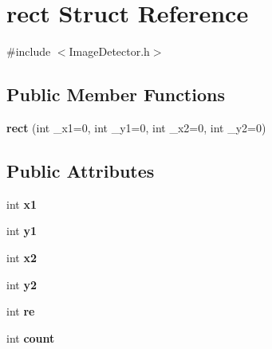 \hypertarget{structrect}{}\section{rect Struct Reference}
\label{structrect}


{\ttfamily \#include $<$Image\+Detector.\+h$>$}

\subsection*{Public Member Functions}
\begin{DoxyCompactItemize}
\item 
\hypertarget{structrect_ac4d3220b8b456e1ba3a17ce1c3c8dd9e}{}{\bfseries rect} (int \+\_\+x1=0, int \+\_\+y1=0, int \+\_\+x2=0, int \+\_\+y2=0)\label{structrect_ac4d3220b8b456e1ba3a17ce1c3c8dd9e}

\end{DoxyCompactItemize}
\subsection*{Public Attributes}
\begin{DoxyCompactItemize}
\item 
\hypertarget{structrect_a69beca6e9401efeab8da0cd15e98b3e6}{}int {\bfseries x1}\label{structrect_a69beca6e9401efeab8da0cd15e98b3e6}

\item 
\hypertarget{structrect_adfb4f185d1c0793506fb29fd553d42b5}{}int {\bfseries y1}\label{structrect_adfb4f185d1c0793506fb29fd553d42b5}

\item 
\hypertarget{structrect_a282dd568f7f09097b0d04d14e8bcd65c}{}int {\bfseries x2}\label{structrect_a282dd568f7f09097b0d04d14e8bcd65c}

\item 
\hypertarget{structrect_a7bffd714159408a1597411ebf9b937d1}{}int {\bfseries y2}\label{structrect_a7bffd714159408a1597411ebf9b937d1}

\item 
\hypertarget{structrect_abef077625c66b02797d2263e824d82b7}{}int {\bfseries re}\label{structrect_abef077625c66b02797d2263e824d82b7}

\item 
\hypertarget{structrect_a717f683ace299d924821febb664eaef0}{}int {\bfseries count}\label{structrect_a717f683ace299d924821febb664eaef0}

\end{DoxyCompactItemize}


